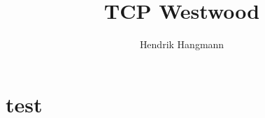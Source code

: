 \documentclass[12pt,twoside,doublepage]{article}
\newcommand{\teilnehmer}{Hendrik Hangmann}
\newcommand{\ausarbeitung}{TCP Westwood}
\begin{document}
\section{test}
	\cite{Brakmo1995}
\title{\ausarbeitung}
\author{\teilnehmer}
\maketitle
\thispagestyle{empty}



%
%


\end{document}
